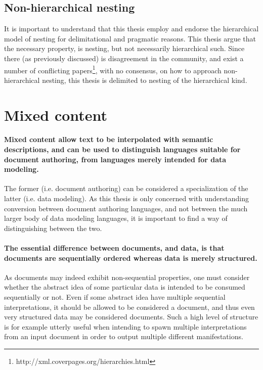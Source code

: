 \documentclass{scrreprt}
\begin{document}
\subsection{Non-hierarchical nesting}
\label{sec:non-hierarchical-nesting}
It is important to understand that this thesis employ and endorse the hierarchical model of nesting for delimitational and pragmatic reasons. This thesis argue that the necessary property, is nesting, but not necessarily hierarchical such. Since there (as previously discussed) is disagreement in the community, and exist a number of conflicting papers\footnote{ http://xml.coverpages.org/hierarchies.html}, with no consensus, on how to approach non-hierarchical nesting, this thesis is delimited to nesting of the hierarchical kind.











\section{Mixed content}
\label{sec:mixed-content}
\paragraph{Mixed content allow text to be interpolated with semantic descriptions, and can be used to distinguish languages suitable for document authoring, from languages merely intended for data modeling.} The former (i.e. document authoring) can be considered a specialization of the latter (i.e. data modeling). As this thesis is only concerned with understanding conversion between document authoring languages, and not between the much larger body of data modeling languages, it is important to find a way of distinguishing between the two.

\paragraph{The essential difference between documents, and data, is that documents are sequentially ordered whereas data is merely structured.} As documents may indeed exhibit non-sequential properties, one must consider whether the abstract idea of some particular data is intended to be consumed sequentially or not. Even if some abstract idea have multiple sequential interpretations, it should be allowed to be considered a document, and thus even very structured data may be considered documents. Such a high level of structure is for example utterly useful when intending to spawn multiple interpretations from an input document in order to output multiple different manifestations.
\end{document}
